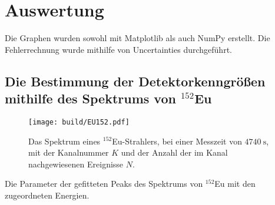 \section{Auswertung}
\label{sec:Auswertung}
Die Graphen wurden sowohl mit Matplotlib \cite{matplotlib} als auch NumPy \cite{numpy} erstellt. Die
Fehlerrechnung wurde mithilfe von Uncertainties \cite{uncertainties} durchgeführt.


\subsection{Die Bestimmung der Detektorkenngrößen mithilfe des Spektrums von $^{152}$Eu} 
\begin{figure}
	\centering
	\texttt{[image: build/EU152.pdf]}
	\caption{Das Spektrum eines $^{152}$Eu-Strahlers, bei einer Messzeit von $\SI{4740}{\second}$, mit der Kanalnummer $K$ und der Anzahl der im Kanal nachgewiesenen Ereignisse $N$.}
	\label{fig:1}
\end{figure}
\begin{table}
	\centering
	\caption{Die Parameter der gefitteten Peaks des Spektrums von $^{152}$Eu mit den zugeordneten Energien.}
	
\end{table}


